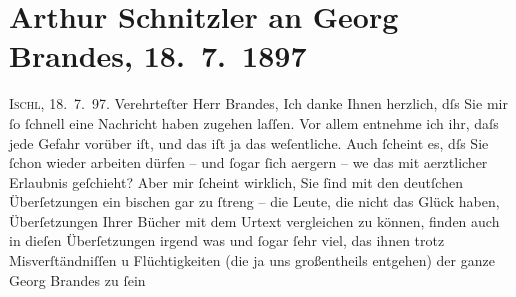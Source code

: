 

         
         \renewcommand{\erwaehntePersonen}{Personen: Peter Altenberg, Richard Beer-Hofmann, Georg Brandes, Paul Goldmann}
         \renewcommand{\erwaehnteInstitutionen}{Institutionen: Frankfurter Zeitung}
         \renewcommand{\erwaehnteOrte}{Orte: Bad Ischl, Dänemark, Kopenhagen, Paris, Wien}
         \renewcommand{\erwaehnteWerke}{Werke: Wie ich es sehe}
               \section[Arthur Schnitzler an Georg Brandes, 18. 7. 1897]{ Arthur Schnitzler an Georg Brandes, 18. 7. 1897}\nopagebreak{}\rehead{ }\begin{ledgroupsized}[t]{13cm}\normalsize\beginnumbering{} \toendnotes[C]{\smallbreak\pagebreak[2]} 
\pstart
           \raggedleft{}{\pb}\textsc{Ischl}, 18. 7. 97. \pend
           \pstart{}Verehrteſter Herr Brandes,\pend\pstart
           Ich danke Ihnen herzlich, dſs Sie mir ſo ſchnell eine Nachricht haben zugehen laſſen.
               Vor allem entnehme ich ihr, daſs jede Gefahr vorüber iſt, und das iſt ja das
               weſentliche. Auch ſcheint es, dſs Sie ſchon wieder arbeiten dürfen – und ſogar ſich
               aergern – we{\geminationn} das mit aerztlicher {\pb}Erlaubnis geſchieht? Aber mir ſcheint wirklich,
               Sie ſind mit den deutſchen Überſetzungen ein bischen gar zu ſtreng – die Leute, die
               nicht das Glück haben, Überſetzungen Ihrer Bücher mit dem Urtext vergleichen zu
               können, finden auch in dieſen Überſetzungen irgend was und ſogar ſehr viel, das \introOben{}ihnen\introOben{} trotz Misverſtändniſſen u Flüchtigkeiten (die ja uns
                  \introOben{}großentheils\introOben{} entgehen) der ganze Georg Brandes zu ſein

\end{ledgroupsized}
